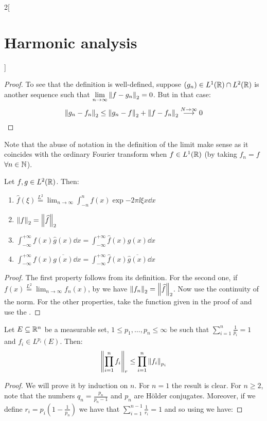 \documentclass[../../../main_math.tex]{subfiles}
\begin{document}
\begin{multicols}{2}[\section{Harmonic analysis}]
\begin{proof}
    To see that the definition is well-defined, suppose $(g_n)\in L^1(\mathbb{R})\cap L^2(\mathbb{R})$ is another sequence such that $\displaystyle\lim_{n\to\infty}\left\|f-g_n\right\|_2=0$. But in that case:
    $$\left\|g_n-f_n\right\|_2\leq\left\|g_n-f\right\|_2+\left\|f-f_n\right\|_2\overset{N\to\infty}{\longrightarrow}0$$
  \end{proof}
  \begin{remark}
    Note that the abuse of notation in the definition of the limit make sense as it coincides with the ordinary Fourier transform when $f\in L^1(\mathbb{R})$ (by taking $f_n=f$ $\forall n\in\mathbb{N}$).
  \end{remark}
  \begin{theorem}
    Let $f,g\in L^2(\mathbb{R})$. Then:
    \begin{enumerate}
      \item $\displaystyle\widehat{f}(\xi)\overset{L^2}{=}\lim_{n\to\infty}\int_{-n}^nf(x)\exp{-2\pi\ii \xi x}\dd{x}$
      \item $\left\|f\right\|_2=\left\|\widehat{f}\right\|_2$
      \item $\displaystyle\int_{-\infty}^{+\infty}f(x)\widehat{g}(x)\dd{x}=\int_{-\infty}^{+\infty}\widehat{f}(x)g(x)\dd{x}$
      \item $\displaystyle\int_{-\infty}^{+\infty}f(x)\overline{g(x)}
              \dd{x}=\int_{-\infty}^{+\infty}\widehat{f}(x)\overline{\widehat{g}(x)}\dd{x}$
    \end{enumerate}
  \end{theorem}
  \begin{proof}
    The first property follows from its definition. For the second one, if $\displaystyle f(x)\overset{L^2}{=}\lim_{n\to\infty}f_n(x)$, by  we have $\left\|f_n\right\|_2=\left\|\widehat{f}\right\|_2$. Now use the continuity of the norm. For the other properties, take the function given in the proof of  and use the .
  \end{proof}
  \begin{lemma}\label{HA:holderGeneralized}
    Let $E\subseteq\mathbb{R}^n$ be a measurable set, $1\leq p_1,\ldots,p_n\leq \infty$ be such that $\sum_{i=1}^n\frac{1}{p_i}=1$ and ${f_i}\in L^{p_i}(E)$. Then:
    $$\left\|\prod_{i=1}^{n}f_i\right\|_r\leq\prod_{i=1}^{n}\left\|{f_i}\right\|_{p_i}$$
  \end{lemma}
  \begin{proof}
    We will prove it by induction on $n$. For $n=1$ the result is clear. For $n\geq 2$, note that the numbers $q_n=\frac{p_n}{p_n-1}$ and $p_n$ are Hölder conjugates. Moreover, if we define $r_i=p_i\left(1-\frac{1}{p_n}\right)$ we have that $\sum_{i=1}^{n-1}\frac{1}{r_i}=1$ and so using  we have:

\end{proof}
\end{multicols}
\end{document}
